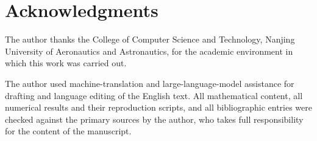 \documentclass[twocolumn,review,hidelinks,oneeqnum,onetabnum,onefignum,onethmnum]{siamart251216}
\begin{document}
\section*{Acknowledgments}
The author thanks the College of Computer Science and Technology, Nanjing
University of Aeronautics and Astronautics, for the academic environment in
which this work was carried out.

The author used machine-translation and large-language-model assistance for
drafting and language editing of the English text. All mathematical content,
all numerical results and their reproduction scripts, and all bibliographic
entries were checked against the primary sources by the author, who takes full
responsibility for the content of the manuscript.


{\small}
\end{document}

